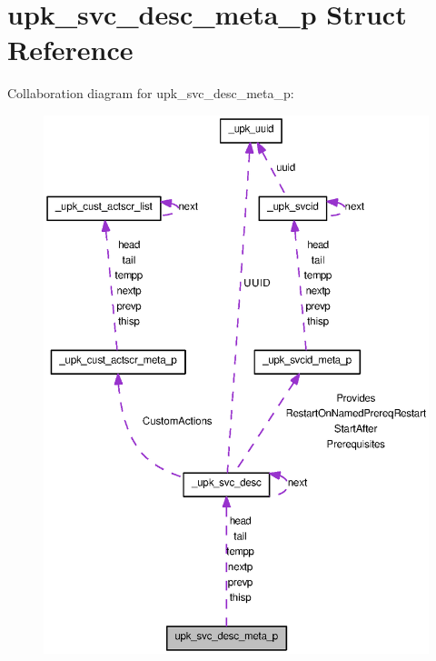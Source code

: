 \section{upk\_\-svc\_\-desc\_\-meta\_\-p Struct Reference}
\label{structupk__svc__desc__meta__p}


Collaboration diagram for upk\_\-svc\_\-desc\_\-meta\_\-p:
\nopagebreak
\begin{figure}[H]
\begin{center}
\leavevmode
\includegraphics[width=400pt]{structupk__svc__desc__meta__p__coll__graph}
\end{center}
\end{figure}
